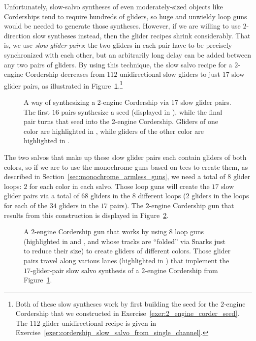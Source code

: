 Unfortunately, slow-salvo syntheses of even moderately-sized objects like Corderships tend to require hundreds of gliders, so huge and unwieldy loop guns would be needed to generate those syntheses. However, if we are willing to use $2$-direction slow syntheses instead, then the glider recipes shrink considerably. That is, we use \emph{slow glider pairs}: the two gliders in each pair have to be precisely synchronized with each other, but an arbitrarily long delay can be added between any two pairs of gliders. By using this technique, the slow salvo recipe for a $2$-engine Cordership decreases from $112$ unidirectional slow gliders to just $17$ slow glider pairs, as illustrated in Figure~\ref{fig:2_engine_cordership_slow_pair_synthesis}.\footnote{Both of these slow syntheses work by first building the seed for the $2$-engine Cordership that we constructed in Exercise~\ref{exer:2_engine_corder_seed}. The $112$-glider unidirectional recipe is given in Exercise~\ref{exer:cordership_slow_salvo_from_single_channel}.}

\begin{figure}[!htb]
	\centering
	\caption{A way of synthesizing a 2-engine Cordership via $17$ slow glider pairs. The first $16$ pairs synthesize a seed (displayed in ), while the final pair turns that seed into the 2-engine Cordership. Gliders of one color are highlighted in 
	, while gliders of the other color are highlighted in .}\label{fig:2_engine_cordership_slow_pair_synthesis}
\end{figure}

The two salvos that make up these slow glider pairs each contain gliders of both colors, so if we are to use the monochrome guns based on tees to create them, as described in Section~\ref{sec:monochrome_armless_guns}, we need a total of $8$ glider loops: $2$ for each color in each salvo. Those loop guns will create the $17$ slow glider pairs via a total of $68$ gliders in the $8$ different loops ($2$ gliders in the loops for each of the $34$ gliders in the $17$ pairs). The $2$-engine Cordership gun that results from this construction is displayed in Figure~\ref{fig:armless_monochrome_cordership_gun}.

\begin{figure}[!htb]
	\centering
	\caption{A $2$-engine Cordership gun that works by using 8 loop guns (highlighted in  and , and whose tracks are ``folded'' via Snarks just to reduce their size) to create gliders of different colors. Those glider pairs travel along various lanes (highlighted in ) that implement the $17$-glider-pair slow salvo synthesis of a $2$-engine Cordership from Figure~\ref{fig:2_engine_cordership_slow_pair_synthesis}.}\label{fig:armless_monochrome_cordership_gun}
\end{figure}

